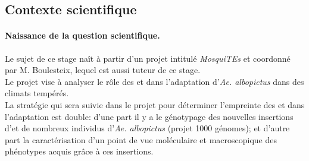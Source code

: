 \documentclass[10pt]{article}
\begin{document}
    
    
    
    
    
    


\subsection{Contexte scientifique}\label{par:context}

\paragraph{Naissance de la question scientifique.} Le sujet de ce stage naît à partir d'un projet intitulé \textit{MosquiTEs} et coordonné par M. Boulesteix, lequel est aussi tuteur de ce stage. \\
Le projet vise à analyser le rôle des \acrlong{et} dans l'adaptation d'\textit{Ae. albopictus} dans des climats tempérés. \\
La stratégie qui sera suivie dans le projet pour déterminer l'empreinte des \acrshort{et} dans l'adaptation est double: d'une part il y a le génotypage des nouvelles insertions d'\acrshort{et} de nombreux individus d'\textit{Ae. albopictus} (projet 1000 génomes); et d'autre part la caractérisation d'un point de vue moléculaire et macroscopique des phénotypes acquis grâce à ces insertions. \\
\end{document}
